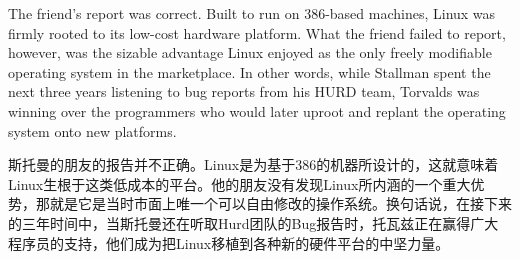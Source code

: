 \ifdefined\eng
The friend's report was correct. Built to run on 386-based machines, Linux was firmly rooted to its low-cost hardware platform. What the friend failed to report, however, was the sizable advantage Linux enjoyed as the only freely modifiable operating system in the marketplace. In other words, while Stallman spent the next three years listening to bug reports from his HURD team, Torvalds was winning over the programmers who would later uproot and replant the operating system onto new platforms.
\fi

\ifdefined\chs
斯托曼的朋友的报告并不正确。Linux是为基于386的机器所设计的，这就意味着Linux生根于这类低成本的平台。他的朋友没有发现Linux所内涵的一个重大优势，那就是它是当时市面上唯一个可以自由修改的操作系统。换句话说，在接下来的三年时间中，当斯托曼还在听取Hurd团队的Bug报告时，托瓦兹正在赢得广大程序员的支持，他们成为把Linux移植到各种新的硬件平台的中坚力量。
\fi


